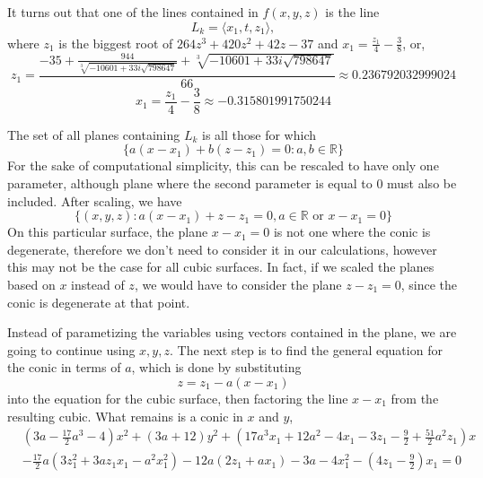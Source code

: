\documentclass{article}
\newcommand{\R}{{\mathbb R}}
\begin{document}
	
	
	It turns out that one of the lines contained in $f(x,y,z)$ is the line 
	\[ L_k = \langle x_1, t, z_1 \rangle, \label{km1_line} \]
	where $z_1$ is the biggest root of $264 z^3 + 420 z^2 + 42 z - 37$ and $x_ 1 = \frac{z_1}{4} - \frac{3}{8}$, or,
	\[ z_1 = \frac{-35  + \frac{944}{\sqrt[3]{-10601 + 33i \sqrt{798647}}} + \sqrt[3]{-10601 + 33i \sqrt{798647}}}{66} \approx 0.236792032999024 \]
	\[ x_1 = \frac{z_1}{4} - \frac{3}{8} \approx -0.315801991750244 \]
	
	The set of all planes containing $L_k$ is all those for which
	\[ \{ a(x-x_1) + b(z-z_1) = 0: a, b \in \R \} \]
	For the sake of computational simplicity, this can be rescaled to have only one parameter, although plane where the second parameter is equal to 0 must also be included. After scaling, we have 
	\[ \{ (x,y,z): a(x-x_1) + z-z_1 = 0,  a \in \R \text{ or } x - x_1 = 0 \} \]
	On this particular surface, the plane $x-x_1 = 0$ is not one where the conic is degenerate, therefore we don't need to consider it in our calculations, however this may not be the case for all cubic surfaces. In fact, if we scaled the planes based on $x$ instead of $z$, we would have to consider the plane $z-z_1 = 0$, since the conic is degenerate at that point. 
	
	Instead of parametizing the variables using vectors contained in the plane, we are going to continue using $x,y,z$. The next step is to find the general equation for the conic in terms of $a$, which is done by substituting
	\[ z = z_1 - a(x-x_1) \]
	into the equation for the cubic surface, then factoring the line $x-x_1$ from the resulting cubic. What remains is a conic in $x$ and $y$, 
	\begin{equation}
	\begin{aligned}
	&\left(3a-\tfrac{17}{2}a^3-4 \right)x^2 +\left(3a+12 \right)y^2+\left(17a^3 x_1 +12a^2-4x_1 -3z_1-\tfrac{9}{2} +\tfrac{51}{2}a^2z_1 \right)x \\ 
	&-\tfrac{17}{2}a\left(3z_1^2+3az_1x_1-a^2x_1^2 \right)-12a\left(2z_1+ax_1 \right)-3a-4x_1^2-\left(4z_1-\tfrac{9}{2} \right)x_1 = 0 \label{conic_eqn}
	\end{aligned}
	\end{equation}
	
\end{document}
